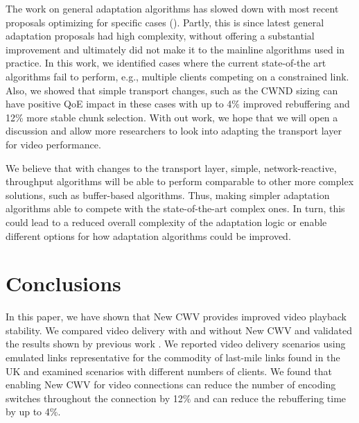\documentclass[10pt,sigconf,anonymous]{acmart}
\begin{document}

The work on general adaptation algorithms has slowed down with most recent proposals optimizing for specific cases (\cite{Karagkioules-2020-achieving-low-latency}). Partly, this is since latest general adaptation proposals had high complexity, without offering a substantial improvement \cite{Yin-2015-a-control-theoritic-approach} and ultimately did not make it to the mainline algorithms used in practice. In this work, we identified cases where the current state-of-the art algorithms fail to perform, e.g., multiple clients competing on a constrained link. Also, we showed that simple transport changes, such as the CWND sizing can have positive QoE impact in these cases with up to 4\% improved rebuffering and 12\% more stable chunk selection. With out work, we hope that we will open a discussion and allow more researchers to look into adapting the transport layer for video performance.

We believe that with changes to the transport layer, simple, network-reactive, throughput algorithms will be able to perform comparable to other more complex solutions, such as buffer-based algorithms. Thus, making simpler adaptation algorithms able to compete with the state-of-the-art complex ones. In turn, this could lead to a reduced overall complexity of the adaptation logic or enable different options for how adaptation algorithms could be improved.

\section{Conclusions}
\label{sec:conclusion}

In this paper, we have shown that New CWV provides improved video playback stability. We compared video delivery with and without New CWV and validated the results shown by previous work \cite{Nazir-2014-performance-evaluation-congestion-window-validation-dash-newcwv}. We reported video delivery scenarios using emulated links representative for the commodity of last-mile links found in the UK and examined scenarios with different numbers of clients. We found that enabling New CWV for video connections can reduce the number of encoding switches throughout the connection by 12\% and can reduce the rebuffering time by up to 4\%.
\end{document}
